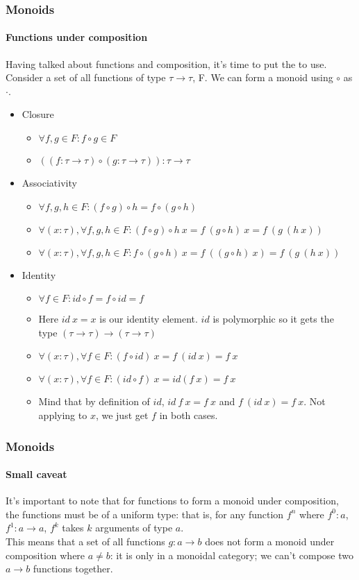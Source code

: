 \documentclass{beamer}
\begin{document}
\begin{frame}
  \frametitle{Monoids}
  \framesubtitle{Functions under composition}
  Having talked about functions and composition, it's time to put the
  to use. Consider a set of all functions of type $\tau \rightarrow \tau$,
  F. We can form a monoid using $\circ$ as $\cdot$.
  \pause
  \begin{itemize}[<+->]
    \item Closure
      \begin{itemize}
        \item $\forall f,g \in F : f \circ g \in F$
        \item $((f:\tau \rightarrow \tau) \circ (g:\tau \rightarrow \tau)):\tau \rightarrow \tau$
      \end{itemize}
    \item Associativity
      \begin{itemize}
        \item $\forall f,g,h \in F : (f \circ g) \circ h = f
          \circ (g \circ h)$
        \item $\forall (x:\tau),\forall f,g,h \in F : (f \circ g) \circ
          h\:x = f\:(g \circ h)\:x = f\:(g\:(h\:x))$
        \item $\forall (x:\tau),\forall f,g,h \in F : f \circ (g \circ
          h)\:x = f\:((g \circ h)\:x) = f\:(g\:(h\:x))$
      \end{itemize}
    \item Identity
      \begin{itemize}
        \item $\forall f \in F: id \circ f = f \circ id = f$
        \item Here $id\:x = x$ is our identity element. $id$ is
          polymorphic so it gets the type $(\tau \rightarrow \tau)
          \rightarrow (\tau \rightarrow \tau)$
        \item $\forall (x:\tau),\forall f \in F: (f \circ id)\:x = f\:(id\:x) = f\:x$
        \item $\forall (x:\tau),\forall f \in F: (id \circ f)\:x =
          id(f\:x) = f\:x$
        \item Mind that by definition of $id$, $id\:f\:x = f\:x$ and
          $f\:(id\:x) = f\:x$. Not applying to $x$, we just get $f$ in
          both cases.
      \end{itemize}
  \end{itemize}
\end{frame}
\begin{frame}
  \frametitle{Monoids}
  \framesubtitle{Small caveat}
  It's important to note that for functions to form a monoid under
  composition, the functions must be of a uniform type: that is, for
  any function $f^n$ where $f^0:a$, $f^1:a \rightarrow a$, $f^k$ takes
  $k$ arguments of type $a$.\\
  \pause
  This means that a set of all functions $g:a \rightarrow b$ does not
  form a monoid under composition where $a \neq b$: it is only in a
  monoidal category; we can't compose two $a \rightarrow b$ functions
  together.\\
  \pause
\end{frame}
\end{document}

